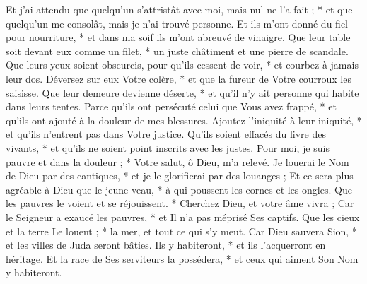 \versseparator
 Et j'ai attendu que quelqu'un s'attristât avec moi, mais nul ne l'a fait ; * et que quelqu'un me consolât, mais je n'ai trouvé personne.
\versseparator
 Et ils m'ont donné du fiel pour nourriture, * et dans ma soif ils m'ont abreuvé de vinaigre.
\versseparator
 Que leur table soit devant eux comme un filet, * un juste châtiment et une pierre de scandale.
\versseparator
 Que leurs yeux soient obscurcis, pour qu'ils cessent de voir, * et courbez à jamais leur dos.
\versseparator
 Déversez sur eux Votre colère, * et que la fureur de Votre courroux les saisisse.
\versseparator
 Que leur demeure devienne déserte, * et qu'il n'y ait personne qui habite dans leurs tentes.
\versseparator
 Parce qu'ils ont persécuté celui que Vous avez frappé, * et qu'ils ont ajouté à la douleur de mes blessures.
\versseparator
 Ajoutez l'iniquité à leur iniquité, * et qu'ils n'entrent pas dans Votre justice.
\versseparator
 Qu'ils soient effacés du livre des vivants, * et qu'ils ne soient point inscrits avec les justes.
\versseparator
 Pour moi, je suis pauvre et dans la douleur ; * Votre salut, ô Dieu, m'a relevé.
\versseparator
 Je louerai le Nom de Dieu par des cantiques, * et je le glorifierai par des louanges ;
\versseparator
 Et ce sera plus agréable à Dieu que le jeune veau, * à qui poussent les cornes et les ongles.
\versseparator
 Que les pauvres le voient et se réjouissent. * Cherchez Dieu, et votre âme vivra ;
\versseparator
 Car le Seigneur a exaucé les pauvres, * et Il n'a pas méprisé Ses captifs.
\versseparator
 Que les cieux et la terre Le louent ; * la mer, et tout ce qui s'y meut.
\versseparator
 Car Dieu sauvera Sion, * et les villes de Juda seront bâties.
\versseparator
 Ils y habiteront, * et ils l'acquerront en héritage.
\versseparator
 Et la race de Ses serviteurs la possédera, * et ceux qui aiment Son Nom y habiteront.